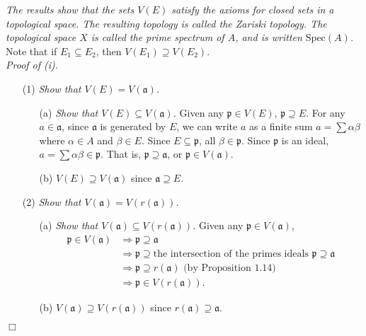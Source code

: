 \documentclass{article}
\begin{document}
\emph{The results show that the sets $V(E)$ satisfy
the axioms for closed sets in a topological space.
The resulting topology is called the Zariski topology.
The topological space $X$ is called the prime spectrum of $A$,
and is written $\text{Spec}(A)$.} \\

Note that if $E_1 \subseteq E_2$,
then $V(E_1) \supseteq V(E_2)$. \\

\emph{Proof of (i).}
\begin{enumerate}
\item[(1)]
\emph{Show that $V(E) = V(\mathfrak{a})$.}
  \begin{enumerate}
  \item[(a)]
  \emph{Show that $V(E) \subseteq V(\mathfrak{a})$.}
  Given any $\mathfrak{p} \in V(E)$, $\mathfrak{p} \supseteq E$.
  For any $a \in \mathfrak{a}$,
  since $\mathfrak{a}$ is generated by $E$,
  we can write $a$ as a finite sum
  $a = \sum \alpha \beta$ where $\alpha \in A$ and $\beta \in E$.
  Since $E \subseteq \mathfrak{p}$, all $\beta \in \mathfrak{p}$.
  Since $\mathfrak{p}$ is an ideal,
  $a = \sum \alpha \beta \in \mathfrak{p}$.
  That is, $\mathfrak{p} \supseteq \mathfrak{a}$,
  or $\mathfrak{p} \in V(\mathfrak{a})$.
  \item[(b)]
  \emph{$V(E) \supseteq V(\mathfrak{a})$} since $\mathfrak{a} \supseteq E$.
  \end{enumerate}
\item[(2)]
\emph{Show that $V(\mathfrak{a}) = V(r(\mathfrak{a}))$.}
  \begin{enumerate}
  \item[(a)]
  \emph{Show that $V(\mathfrak{a}) \subseteq V(r(\mathfrak{a}))$.}
  Given any $\mathfrak{p} \in V(\mathfrak{a})$,
  \begin{align*}
  \mathfrak{p} \in V(\mathfrak{a})
  &\Longrightarrow \mathfrak{p} \supseteq \mathfrak{a} \\
  &\Longrightarrow \mathfrak{p} \supseteq \text{the intersection of the primes ideals }
  \mathfrak{p} \supseteq \mathfrak{a} \\
  &\Longrightarrow \mathfrak{p} \supseteq r(\mathfrak{a}) \text{ (by Proposition 1.14)}\\
  &\Longrightarrow \mathfrak{p} \in V(r(\mathfrak{a})).
  \end{align*}
  \item[(b)]
  \emph{$V(\mathfrak{a}) \supseteq V(r(\mathfrak{a}))$}
  since $r(\mathfrak{a}) \supseteq \mathfrak{a}$.
  \end{enumerate}
\end{enumerate}
$\Box$ \\
\end{document}
